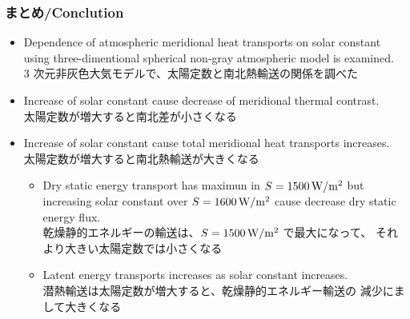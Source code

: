\documentclass[aspectratio=149,9pt,fleqn,tbtags]{beamer}
\newcommand{\jp}[1]{{\footnotesize #1}}
\begin{document}
\begin{frame}
	\frametitle{まとめ/Conclution}
	\begin{itemize}
		\item Dependence of atmospheric meridional heat transports
			on solar constant using three-dimentional spherical non-gray atmospheric model is examined.\\
			\jp{3 次元非灰色大気モデルで、太陽定数と南北熱輸送の関係を調べた}
		\item Increase of solar constant cause decrease of meridional thermal contrast.\\
			\jp{太陽定数が増大すると南北差が小さくなる}
		\item Increase of solar constant cause total meridional heat transports increases.\\
			\jp{太陽定数が増大すると南北熱輸送が大きくなる}
			\begin{itemize}
				\item Dry static energy transport has maximun in \(S=1500\hmu{W/m^2}\)
					but increasing solar constant over \(S=1600\hmu{W/m^2}\) cause decrease
					dry static energy flux.\\
					\jp{乾燥静的エネルギーの輸送は、\(S=1500\hmu{W/m^2}\) で最大になって、
					それより大きい太陽定数では小さくなる}
				\item Latent energy transports increases as solar constant increases.\\
					\jp{潜熱輸送は太陽定数が増大すると、乾燥静的エネルギー輸送の
					減少にまして大きくなる}
			\end{itemize}
	\end{itemize}
\end{frame}
\end{document}
